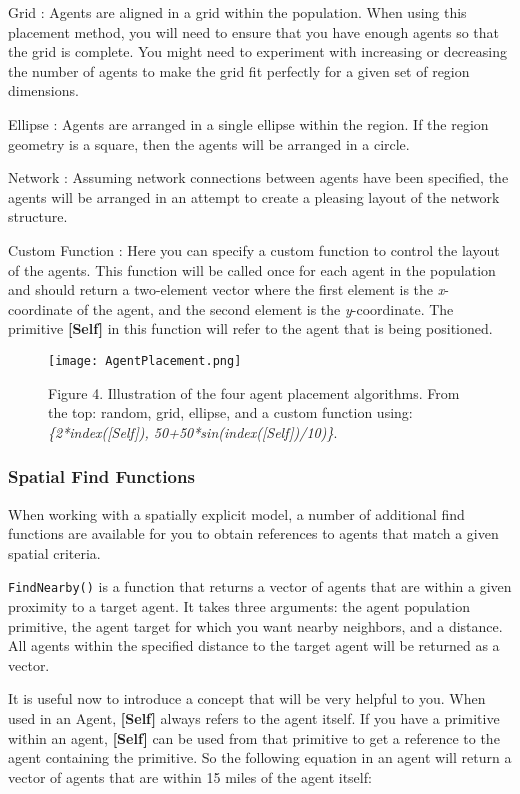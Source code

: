 \documentclass[]{memoir}
\let\Oldincludegraphics\includegraphics
\renewcommand{\includegraphics}[1]{\Oldincludegraphics[max size={\textwidth}{\textheight}]{#1}}
\newcommand{\p}[1]{\textbf{{[}#1{]}}}
\begin{document}
Grid : Agents are aligned in a grid within the population. When using
this placement method, you will need to ensure that you have enough
agents so that the grid is complete. You might need to experiment with
increasing or decreasing the number of agents to make the grid fit
perfectly for a given set of region dimensions.

Ellipse : Agents are arranged in a single ellipse within the region. If
the region geometry is a square, then the agents will be arranged in a
circle.

Network : Assuming network connections between agents have been
specified, the agents will be arranged in an attempt to create a
pleasing layout of the network structure.

Custom Function : Here you can specify a custom function to control the
layout of the agents. This function will be called once for each agent
in the population and should return a two-element vector where the first
element is the \emph{x}-coordinate of the agent, and the second element
is the \emph{y}-coordinate. The primitive \p{Self} in this function will
refer to the agent that is being positioned.

\begin{figure}[htbp]
\centering
\texttt{[image: AgentPlacement.png]}
\caption{Figure 4. Illustration of the four agent placement algorithms.
From the top: random, grid, ellipse, and a custom function using:
\emph{\{2*index({[}Self{]}), 50+50*sin(index({[}Self{]})/10)\}}.}
\end{figure}

\subsubsection{Spatial Find Functions}

When working with a spatially explicit model, a number of additional
find functions are available for you to obtain references to agents that
match a given spatial criteria.

\lstinline!FindNearby()! is a function that returns a vector of agents
that are within a given proximity to a target agent. It takes three
arguments: the agent population primitive, the agent target for which
you want nearby neighbors, and a distance. All agents within the
specified distance to the target agent will be returned as a vector.

It is useful now to introduce a concept that will be very helpful to
you. When used in an Agent, \p{Self} always refers to the agent itself.
If you have a primitive within an agent, \p{Self} can be used from that
primitive to get a reference to the agent containing the primitive. So
the following equation in an agent will return a vector of agents that
are within 15 miles of the agent itself:
\end{document}
